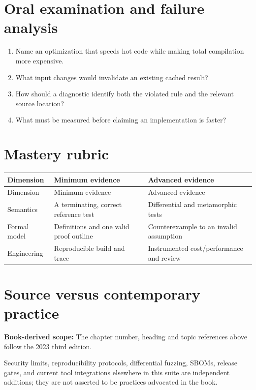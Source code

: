\documentclass[10pt,letterpaper]{article}
\begin{document}
\section{Oral examination and failure analysis}
\begin{enumerate}
\item Name an optimization that speeds hot code while making total compilation more expensive.
\item What input changes would invalidate an existing cached result?
\item How should a diagnostic identify both the violated rule and the relevant source location?
\item What must be measured before claiming an implementation is faster?
\end{enumerate}

\section{Mastery rubric}
\begin{longtable}{|>{\raggedright\arraybackslash}p{}|>{\raggedright\arraybackslash}p{}|>{\raggedright\arraybackslash}p{}|}
\hline
Dimension & Minimum evidence & Advanced evidence\\ \hline\endfirsthead
\hline
Dimension & Minimum evidence & Advanced evidence\\ \hline\endhead
Semantics & A terminating, correct reference test & Differential and metamorphic tests\\ \hline
Formal model & Definitions and one valid proof outline & Counterexample to an invalid assumption\\ \hline
Engineering & Reproducible build and trace & Instrumented cost/performance and review\\ \hline
\end{longtable}

\section{Source versus contemporary practice}
\textbf{Book-derived scope:} The chapter number, heading and topic references above follow the 2023 third edition.\par\modern Security limits, reproducibility protocols, differential fuzzing, SBOMs, release gates, and current tool integrations elsewhere in this suite are independent additions; they are not asserted to be practices advocated in the book.
\end{document}
